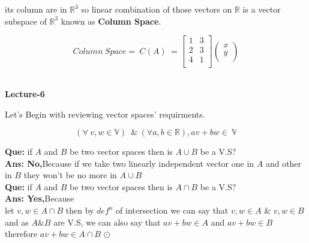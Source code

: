 \documentclass[a4paper,11pt]{article}
\numberwithin{equation}{section}
\begin{document}
\begin{itemize}
its column are in $\mathbb{R}^3 $ so linear combination of those vectors on $\mathbb{R}$ is a vector subspace of $\mathbb{R}^3$ known as \textbf{Column Space}.

\begin{equation}
    Column \hspace{3pt} Space= \hspace{3pt} C(A) \hspace{3pt}=\begin{bmatrix}
        1&3\\
        2&3\\
        4&1\\
    \end{bmatrix}
    \begin{pmatrix}
        x\\
        y\\
    \end{pmatrix}
\end{equation}\\

\begin{center}
    \Huge{\textbf{Lecture-6}}
\end{center}
\vspace{5pt}

Let's Begin with reviewing vector spaces' requirments.

\begin{equation}
    (\forall \hspace{3pt} v,w\in\mathbb{V} ) \hspace{3pt} \hspace{3pt} \&\hspace{3pt} (\forall a,b\in \mathbb{R}), av+bw\in \hspace{3pt} \mathbb{V} 
\end{equation}

\textbf{Que: }if $A$ and $B$ be two vector spaces then is $A \cup B$ be a V.S?\\
\textbf{Ans: No,}Because if we take two linearly independent vector one in $A$ and other in $B$ they won't be no more in $A \cup B$ \\

\textbf{Que: }if $A$ and $B$ be two vector spaces then is $A \cap B$ be a V.S?\\
\textbf{Ans: Yes,}Because  \\
let $v,w\in A\cap B$ then by $def^n$ of intersection we can say that $v,w\in A$ \& $v,w\in B$ and as $A\&B$ are V.S, we can also say that $av+bw\in A$ and $av+bw\in B$ therefore $av+bw\in A\cap B$ $\odot $ \\


\end{itemize}
\end{document}
